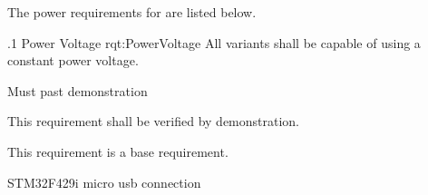 The power requirements for \ThisSystem are listed below.

\ONERQMTVKPP
{\RqtNumberBase.1}
{Power Voltage}
{rqt:PowerVoltage}
{All \ThisSys variants shall be capable of using a constant power voltage.}
{
	\item [Phase 1] Must past demonstration
}
{This requirement shall be verified by demonstration.}
{
	\item [N/A] This requirement is a base requirement.
}
{
  \item STM32F429i micro usb connection
}
